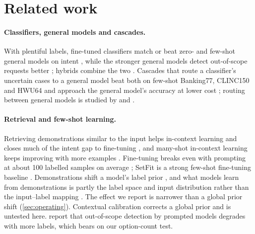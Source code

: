 \documentclass[11pt]{article}
\begin{document}
\section{Related work}

\paragraph{Classifiers, general models and cascades.} With plentiful labels, fine-tuned classifiers match or beat zero- and few-shot general models on intent \citep{rodrigues2026nlu}, while the stronger general models detect out-of-scope requests better \citep{rodrigues2026nlu,arora2024intent}; hybrids combine the two \citep{castillo2025oos}. Cascades that route a classifier's uncertain cases to a general model beat both on few-shot Banking77, CLINC150 and HWU64 \citep{chen2025fcslm} and approach the general model's accuracy at lower cost \citep{zaera2025udril,arora2024intent}; routing between general models is studied by \citet{bouchard2026escalation} and \citet{llmrouterbench2026}.

\paragraph{Retrieval and few-shot learning.} Retrieving demonstrations similar to the input helps in-context learning \citep{liu2022kate} and closes much of the intent gap to fine-tuning \citep{milios2023manylabels,loukas2023penny}, and many-shot in-context learning keeps improving with more examples \citep{bertsch2024longicl}. Fine-tuning breaks even with prompting at about 100 labelled samples on average \citep{pecher2025breakeven}; SetFit is a strong few-shot fine-tuning baseline \citep{tunstall2022setfit}. Demonstrations shift a model's label prior \citep{zhao2021calibrate}, and what models learn from demonstrations is partly the label space and input distribution rather than the input--label mapping \citep{min2022demonstrations}. The effect we report is narrower than a global prior shift (\cref{sec:operating}). Contextual calibration \citep{zhao2021calibrate} corrects a global prior and is untested here. \citet{arora2024intent} report that out-of-scope detection by prompted models degrades with more labels, which bears on our option-count test.
\end{document}
